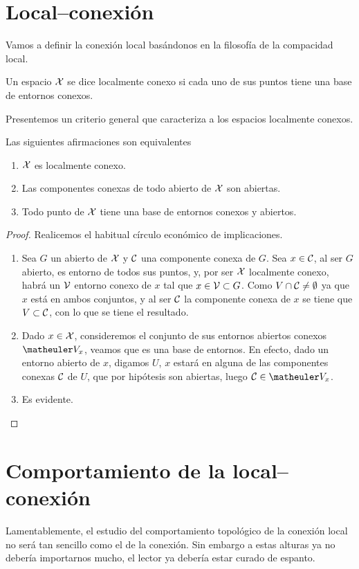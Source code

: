 \section{Local--conexión}
Vamos a definir la conexión local basándonos en la filosofía de la compacidad local.
\begin{defi}
	Un espacio $\mathcal{X}$ se dice localmente conexo si cada uno de sus puntos tiene una base de entornos conexos.
\end{defi}
Presentemos un criterio general que caracteriza a los espacios localmente conexos.
\begin{prop}[Caracterización] Las siguientes afirmaciones son equivalentes
	\begin{enumerate}
		\item $\mathcal{X}$ es localmente conexo.
		\item Las componentes conexas de todo abierto de $\mathcal{X}$ son abiertas.
		\item Todo punto de $\mathcal{X}$ tiene una base de entornos conexos y abiertos.
	\end{enumerate}
\end{prop}
\begin{proof}Realicemos el habitual círculo económico de implicaciones.
	\begin{enumerate}[align=left, leftmargin=*]
		\item[\fbox{$(1)\ra (2)$}] Sea $G$ un abierto de $\mathcal{X}$ y $\mathcal{C}$ una componente conexa de $G$. Sea $x\in \mathcal{C}$, al ser $G$ abierto, es entorno de todos sus puntos, y, por ser $\mathcal{X}$ localmente conexo, habrá un $\mathcal{V}$ entorno conexo de $x$ tal que $x\in \mathcal{V}\subset G$. Como $V\cap\mathcal{C}\not=\emptyset$ ya que $x$ está en ambos conjuntos, y al ser $\mathcal{C}$ la componente conexa de $x$ se tiene que $V\subset\mathcal{C}$, con lo que se tiene el resultado.
		\item[\fbox{$(2)\ra (3)$}] Dado $x\in\mathcal{X}$, consideremos el conjunto de sus entornos abiertos conexos $\Va{x}$, veamos que es una base de entornos. En efecto, dado un entorno abierto de $x$, digamos $U$, $x$ estará en alguna de las componentes conexas $\mathcal{C}$ de $U$, que por hipótesis son abiertas, luego $\Co\in\Va{x}$.  
		\item[\fbox{$(3)\ra (1)$}] Es evidente.\qedhere
	\end{enumerate}
\end{proof}
\section{Comportamiento de la local--conexión}
Lamentablemente, el estudio del comportamiento topológico de la conexión local no será tan sencillo como el de la conexión. Sin embargo a estas alturas ya no debería importarnos mucho, el lector ya debería estar curado de espanto.

